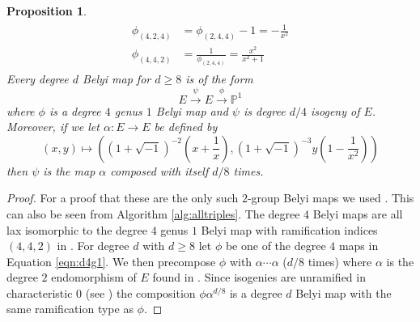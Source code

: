 \documentclass{dcthesis}
\newcommand{\PP}{\mathbb P}
\newtheorem{prop}{Proposition}[section]
\theoremstyle{definition}
\theoremstyle{remark}
\numberwithin{equation}{section}
\numberwithin{figure}{section}
\begin{document}
{{\begin{prop}
\begin{align}
\begin{split}
          \phi_{(4,2,4)} &= \phi_{(2,4,4)} - 1=-\frac{1}{x^2}\\
          \phi_{(4,4,2)} &= \frac{1}{\phi_{(2,4,4)}} = \frac{x^2}{x^2+1}
        \end{split}
      \end{align}
      Every degree $d$ Belyi map
      for $d\geq 8$ is of the form
      \[
        E\stackrel{\psi}{\to}E\stackrel{\phi}{\to}\PP^1
      \]
      where $\phi$ is a degree $4$ genus $1$ Belyi map
      and $\psi$ is degree $d/4$ isogeny of $E$.
      Moreover,
      if we let $\alpha\colon E\to E$ be defined by
      \begin{equation}\label{eqn:alpha}
        (x,y)\mapsto
        \left(
          (1+\sqrt{-1})^{-2}\left(x+\frac{1}{x}\right),
          (1+\sqrt{-1})^{-3}y\left(1-\frac{1}{x^2}\right)
        \right)
      \end{equation}
      then $\psi$ is the map $\alpha$ composed with itself
      $d/8$ times.
    \end{prop}
    \begin{proof}
      For a proof that these are the only such $2$-group Belyi maps
      we used \cite[Lemma 3.5]{triangles}.
      This can also be seen from Algorithm \ref{alg:alltriples}.
      The degree $4$ Belyi maps are all lax isomorphic
      to the degree $4$ genus $1$ Belyi map with
      ramification indices $(4,4,2)$ in
      \cite{belyidb}.
      For degree $d$ with $d\geq 8$
      let $\phi$ be one of the degree $4$ maps in
      Equation \ref{eqn:d4g1}.
      We then precompose
      $\phi$
      with $\alpha\cdots\alpha$ ($d/8$ times)
      where $\alpha$ is the
      degree $2$ endomorphism of $E$
      found in
      \cite[Proposition 2.3.1]{advancedsilverman}.
      Since isogenies are unramified
      in characteristic $0$
      (see \cite[Chapter III, Theorem 4.10]{silverman})
      the composition $\phi\alpha^{d/8}$
      is a degree $d$ Belyi map with the same ramification type as $\phi$.
    \end{proof}
  }
}
\end{document}
